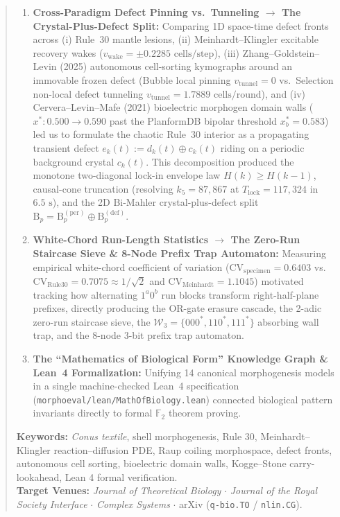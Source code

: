 \documentclass[11pt,a4paper]{article}
\theoremstyle{definition}
\theoremstyle{remark}
\newcommand{\Ftwo}{\mathbb{F}_2}
\begin{document}
\begin{abstract}
\begin{enumerate}
  \item \textbf{Cross-Paradigm Defect Pinning vs.\ Tunneling $\longrightarrow$ The Crystal-Plus-Defect Split:} Comparing 1D space-time defect fronts across (i) Rule~30 mantle lesions, (ii) Meinhardt--Klingler excitable recovery wakes ($v_{\mathrm{wake}} = \pm 0.2285\text{ cells/step}$), (iii) Zhang--Goldstein--Levin (2025) autonomous cell-sorting kymographs around an immovable frozen defect (Bubble local pinning $v_{\mathrm{tunnel}}=0$ vs.\ Selection non-local defect tunneling $v_{\mathrm{tunnel}}=1.7889\text{ cells/round}$), and (iv) Cervera--Levin--Mafe (2021) bioelectric morphogen domain walls ($x^*: 0.500 \to 0.590$ past the PlanformDB bipolar threshold $x^*_b = 0.583$) led us to formulate the chaotic Rule~30 interior as a propagating transient defect $e_k(t) := d_k(t) \oplus c_k(t)$ riding on a periodic background crystal $c_k(t)$. This decomposition produced the monotone two-diagonal lock-in envelope law $H(k) \ge H(k-1)$, causal-cone truncation (resolving $k_5 = 87{,}867$ at $T_{\mathrm{lock}} = 117{,}324$ in $6.5\text{ s}$), and the 2D Bi-Mahler crystal-plus-defect split $\mathrm{B}_p = \mathrm{B}_p^{(\mathrm{per})} \oplus \mathrm{B}_p^{(\mathrm{def})}$.
  \item \textbf{White-Chord Run-Length Statistics $\longrightarrow$ The Zero-Run Staircase Sieve \& 8-Node Prefix Trap Automaton:} Measuring empirical white-chord coefficient of variation ($\mathrm{CV}_{\mathrm{specimen}} = 0.6403$ vs.\ $\mathrm{CV}_{\mathrm{Rule30}} = 0.7075 \approx 1/\sqrt{2}$ and $\mathrm{CV}_{\mathrm{Meinhardt}} = 1.1045$) motivated tracking how alternating $1^a 0^b$ run blocks transform right-half-plane prefixes, directly producing the OR-gate erasure cascade, the 2-adic zero-run staircase sieve, the $\mathcal{W}_3 = \{000^*, 110^*, 111^*\}$ absorbing wall trap, and the 8-node 3-bit prefix trap automaton.
  \item \textbf{The ``Mathematics of Biological Form'' Knowledge Graph \& Lean~4 Formalization:} Unifying 14 canonical morphogenesis models in a single machine-checked Lean~4 specification (\texttt{morphoeval/lean/MathOfBiology.lean}) connected biological pattern invariants directly to formal $\Ftwo$ theorem proving.
\end{enumerate}

\noindent\textbf{Keywords:} \emph{Conus textile}, shell morphogenesis, Rule 30, Meinhardt--Klingler reaction--diffusion PDE, Raup coiling morphospace, defect fronts, autonomous cell sorting, bioelectric domain walls, Kogge--Stone carry-lookahead, Lean 4 formal verification.\\
\textbf{Target Venues:} \emph{Journal of Theoretical Biology} $\cdot$ \emph{Journal of the Royal Society Interface} $\cdot$ \emph{Complex Systems} $\cdot$ arXiv (\texttt{q-bio.TO} / \texttt{nlin.CG}).
\end{abstract}
\end{document}
